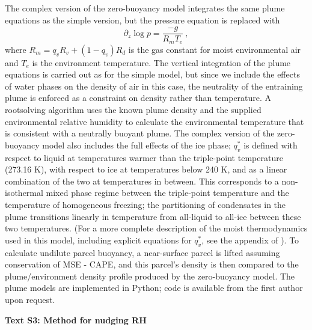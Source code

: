 \documentclass[draft,grl]{agutexSI}
\begin{document}
\begin{article}
The complex version of the zero-buoyancy model integrates the same plume equations as the simple version, but the pressure equation is replaced with
\begin{equation}
\partial_z \log p = \frac{-g}{R_m T_e}\ ,
\end{equation}
\noindent where $R_m = q_{v}R_v + (1 - q_{v})R_d$ is the gas constant for moist environmental air and $T_e$ is the environment temperature. The vertical integration of the plume equations is carried out as for the simple model, but since we include the effects of water phases on the density of air in this case, the neutrality of the entraining plume is enforced as a constraint on density rather than temperature. A rootsolving algorithm uses the known plume density and the supplied environmental relative humidity to calculate the environmental temperature that is consistent with a neutrally buoyant plume. The complex version of the zero-buoyancy model also includes the full effects of the ice phase; $q_v^*$ is defined with respect to liquid at temperatures warmer than the triple-point temperature (273.16 K), with respect to ice at temperatures below 240 K, and as a linear combination of the two at temperatures in between. This corresponds to a non-isothermal mixed phase regime between the triple-point temperature and the temperature of homogeneous freezing; the partitioning of condensates in the plume transitions linearly in temperature from all-liquid to all-ice between these two temperatures. (For a more complete description of the moist thermodynamics used in this model, including explicit equations for $q_v^*$, see the appendix of \cite{Romps2015}). To calculate undilute parcel buoyancy, a near-surface parcel is lifted assuming conservation of MSE - CAPE, and this parcel's density is then compared to the plume/environment density profile produced by the zero-buoyancy model. The plume models are implemented in Python; code is available from the first author upon request. 

\noindent\textbf{Text S3: Method for nudging RH}


\end{article}
\end{document}
